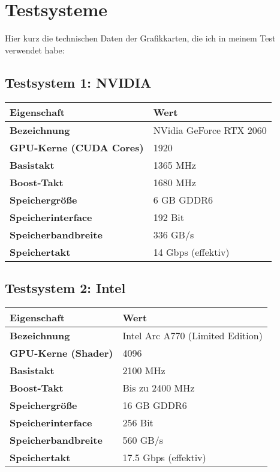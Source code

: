 \documentclass[12pt]{article}
\begin{document}
	\section*{Testsysteme}
	Hier kurz die technischen Daten der Grafikkarten, die ich in meinem Test verwendet habe:
	
	\subsection*{Testsystem 1: NVIDIA}
	\begin{tabular}{@{}ll@{}}
		\toprule
		\textbf{Eigenschaft}             & \textbf{Wert}                      \\ \midrule
		\textbf{Bezeichnung}			& NVidia GeForce RTX 2060			\\
		\textbf{GPU-Kerne (CUDA Cores)} & 1920                               \\
		\textbf{Basistakt}              & 1365 MHz                           \\
		\textbf{Boost-Takt}             & 1680 MHz                           \\
		\textbf{Speichergröße}          & 6 GB GDDR6                         \\
		\textbf{Speicherinterface}      & 192 Bit                            \\
		\textbf{Speicherbandbreite}     & 336 GB/s                           \\
		\textbf{Speichertakt}           & 14 Gbps (effektiv)                 \\
		\bottomrule
	\end{tabular}
	
	\subsection*{Testsystem 2: Intel}
	\begin{tabular}{@{}ll@{}}
		\toprule
		\textbf{Eigenschaft}             & \textbf{Wert}                         \\ \midrule
		\textbf{Bezeichnung}		     & Intel Arc A770 (Limited Edition)		\\
		\textbf{GPU-Kerne (Shader)}      & 4096                                   \\
		\textbf{Basistakt}               & 2100 MHz                              \\
		\textbf{Boost-Takt}              & Bis zu 2400 MHz                       \\
		\textbf{Speichergröße}           & 16 GB GDDR6                           \\
		\textbf{Speicherinterface}       & 256 Bit                               \\
		\textbf{Speicherbandbreite}      & 560 GB/s                              \\
		\textbf{Speichertakt}            & 17.5 Gbps (effektiv)                  \\
		\bottomrule
	\end{tabular}
	
	
	
	
	
	
	
	
	
	
	
\end{document}
